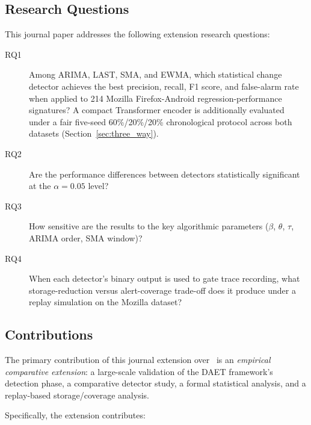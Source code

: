 \documentclass[a4paper,fleqn]{cas-sc}
\theoremstyle{plain}
\begin{document}
\subsection{Research Questions}\label{sec:intro:rqs}

This journal paper addresses the following extension research questions:

\begin{description}
  \item[RQ1] Among ARIMA, LAST, SMA, and EWMA, which statistical change detector achieves the best
    precision, recall, F1 score, and false-alarm rate when applied to 214
    Mozilla Firefox-Android regression-performance signatures?
    A compact Transformer encoder is additionally evaluated under a fair
    five-seed 60\%/20\%/20\% chronological protocol across both datasets
    (Section~\ref{sec:three_way}).
  \item[RQ2] Are the performance differences between detectors statistically
    significant at the $\alpha=0.05$ level?
  \item[RQ3] How sensitive are the results to the key algorithmic parameters
    ($\beta$, $\theta$, $\tau$, ARIMA order, SMA window)?
  \item[RQ4] When each detector's binary output is used to gate trace recording,
    what storage-reduction versus alert-coverage trade-off does it produce under
    a replay simulation on the Mozilla dataset?
\end{description}

\subsection{Contributions}\label{sec:intro:contrib}

The primary contribution of this journal extension over~\cite{10197790} is an
\emph{empirical comparative extension}: a large-scale validation of the DAET
framework's detection phase, a comparative detector study, a formal statistical
analysis, and a replay-based storage/coverage analysis.


Specifically, the extension contributes:
\end{document}

